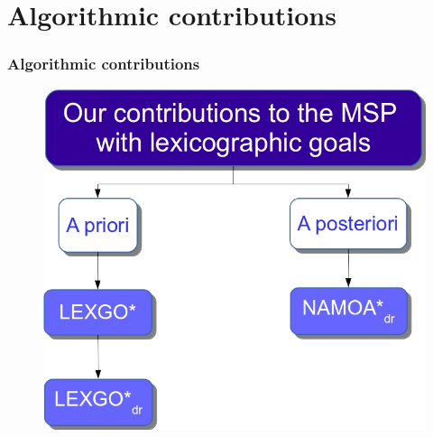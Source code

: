 %
%
%
%

\section{Algorithmic contributions}
\begin{frame}
\frametitle{Algorithmic contributions}
	\begin{figure}
    	\centering
		\includegraphics[scale=0.4]{figs/contributions}
	\end{figure}
\note{}
\end{frame}
